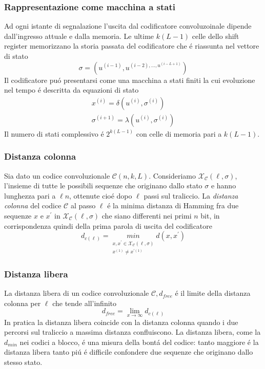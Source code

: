         \subsubsection{Rappresentazione come macchina a stati}
            Ad ogni istante di segnalazione l'uscita dal codificatore convoluzoinale dipende 
            dall'ingresso attuale e dalla memoria. Le ultime $k(L-1)$ celle dello shift register memorizzano la 
            storia passata del codificatore che é riassunta nel vettore di stato 
            \[
                \sigma = \left(u^{(i-1)},u^{(i-2),\dots, u^{(i-L+1)}}\right)  
            \]
            Il codificatore puó presentarsi come una macchina a stati finiti la cui evoluzione nel tempo
            é descritta da equazioni di stato 
            \begin{gather}
                x^{(i)} = \delta\left(u^{(i)},\sigma^{(i)}\right)\nonumber \\
                \sigma^{(i+1)} = \lambda\left(u^{(i)},\sigma^{(i)}\right)\nonumber 
            \end{gather}
            Il numero di stati complessivo é $2^{k(L-1)}$ con celle di memoria pari a $k(L-1)$.
        \subsubsection{Distanza colonna}
            Sia dato un codice convoluzionale $\mathcal{C}(n,k,L)$. Consideriamo $\mathcal{X}_\mathcal{C}(\ell,\sigma)$, l'insieme
            di tutte le possibili sequenze che originano dallo stato $\sigma$ e hanno lunghezza pari a $\ell n$, ottenute cioé dopo 
            $\ell$ passi sul traliccio. La \emph{distanza colonna} del codice $\mathcal{C}$ al passo $\ell$ é la minima distanza di Hamming
            fra due sequenze $x$ e $x^\prime$ in $\mathcal{X}_\mathcal{C}(\ell,\sigma)$ che siano differenti nei primi $n$ bit, in corrispondenza
            quindi della prima parola di uscita del codificatore 
            \[
                d_{c(\ell)} = \underset{\substack{x,x^\prime \in \mathcal{X}_\mathcal{C}(\ell,\sigma) \\ x^{(1)}\neq x^{\prime(1)} }}{min} d(x,x^\prime)  
            \]
        \subsubsection{Distanza libera}
            La distanza libera di un codice convoluzionale $\mathcal{C},d_{free}$ é il limite della distanza colonna per $\ell$ che tende 
            all'infinito
            \[
                d_{free} = \lim_{x\rightarrow \infty} d_{c(\ell)}  
            \]
            In pratica la distanza libera coincide con la distanza colonna quando i due percorsi sul traliccio a massima distanza confluiscono.
            La distanza libera, come la $d_{min}$ nei codici a blocco, é una misura della bontá del codice: tanto maggiore é la distanza libera 
            tanto piú é difficile confondere due sequenze che originano dallo stesso stato.
